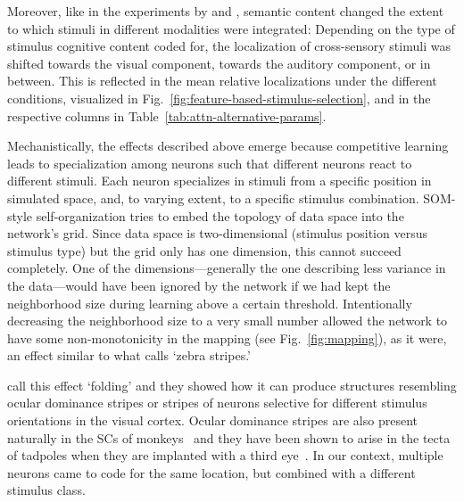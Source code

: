     Moreover, like in the experiments by \citet{warren-et-al-1981} and \citet{jack-and-thurlow-1973}, semantic content changed the extent to which stimuli in different modalities were integrated:
    Depending on the type of stimulus cognitive content coded for, the localization of cross-sensory stimuli was shifted towards the visual component, towards the auditory component, or in between.
    This is reflected in the mean relative localizations under the different conditions, visualized in Fig.~\ref{fig:feature-based-stimulus-selection}, and in the respective columns in Table~\ref{tab:attn-alternative-params}.

    Mechanistically, the effects described above emerge because competitive learning leads to specialization among neurons such that different neurons react to different stimuli.
    Each neuron specializes in stimuli from a specific position in simulated space, and, to varying extent, to a specific stimulus combination.
    \ac{SOM}-style self-organization tries to embed the topology of data space into the network's grid.
    Since data space is two-dimensional (stimulus position versus stimulus type) but the grid only has one dimension, this cannot succeed completely.
    One of the dimensions---generally the one describing less variance in the data---would have been ignored by the network if we had kept the neighborhood size during learning above a certain threshold.
    Intentionally decreasing the neighborhood size to a very small number allowed the network to have some non-monotonicity in the mapping (see Fig.~\ref{fig:mapping}), as it were, an effect similar to what \citet[p.~87~\emph{f}]{kohonen-1995} calls `zebra stripes.'

    \citet[p.~62~\emph{f}]{miikkulainen-et-al-2005} call this effect `folding' and they showed how it can produce structures resembling ocular dominance stripes or stripes of neurons selective for different stimulus orientations in the visual cortex.
    Ocular dominance stripes are also present naturally in the \acp{SC} of monkeys~\citep{pollack-and-hickey-1979} and they have been shown to arise in the tecta of tadpoles when they are implanted with a third eye~\citep{law-and-constantine-paton-1981}.
    In our context, multiple neurons came to code for the same location, but combined with a different stimulus class.

